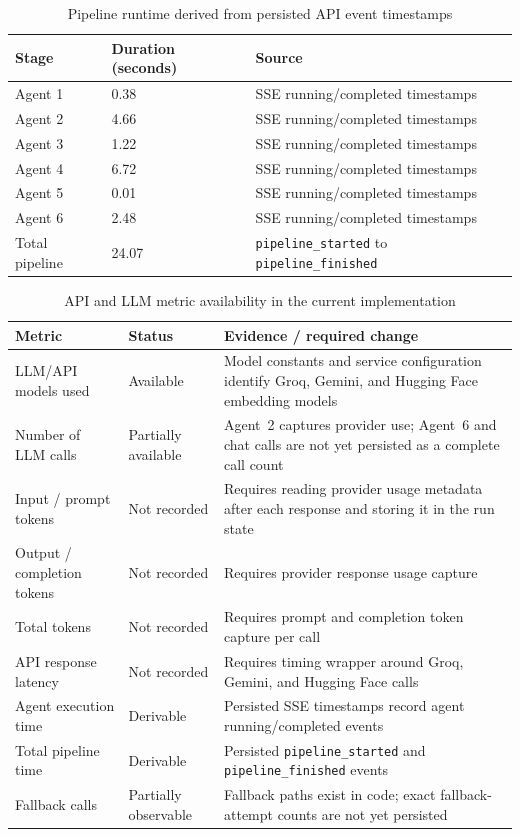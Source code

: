 \documentclass[12pt,a4paper,openany]{report}
\begin{document}
\begin{table}[H]
\centering
\caption{Pipeline runtime derived from persisted API event timestamps}
\label{tab:runtime-results}
\begin{tabular}{p{5cm} p{4cm} p{4cm}}
\hline
Stage & Duration (seconds) & Source \\
\hline
Agent 1 & 0.38 & SSE running/completed timestamps \\
Agent 2 & 4.66 & SSE running/completed timestamps \\
Agent 3 & 1.22 & SSE running/completed timestamps \\
Agent 4 & 6.72 & SSE running/completed timestamps \\
Agent 5 & 0.01 & SSE running/completed timestamps \\
Agent 6 & 2.48 & SSE running/completed timestamps \\
Total pipeline & 24.07 & \texttt{pipeline\_started} to \texttt{pipeline\_finished} \\
\hline
\end{tabular}
\end{table}

\begin{table}[H]
\centering
\caption{API and LLM metric availability in the current implementation}
\label{tab:api-observability}
\begin{tabular}{p{4cm} p{4cm} p{6cm}}
\hline
Metric & Status & Evidence / required change \\
\hline
LLM/API models used & Available & Model constants and service configuration identify Groq, Gemini, and Hugging Face embedding models \\
Number of LLM calls & Partially available & Agent~2 captures provider use; Agent~6 and chat calls are not yet persisted as a complete call count \\
Input / prompt tokens & Not recorded & Requires reading provider usage metadata after each response and storing it in the run state \\
Output / completion tokens & Not recorded & Requires provider response usage capture \\
Total tokens & Not recorded & Requires prompt and completion token capture per call \\
API response latency & Not recorded & Requires timing wrapper around Groq, Gemini, and Hugging Face calls \\
Agent execution time & Derivable & Persisted SSE timestamps record agent running/completed events \\
Total pipeline time & Derivable & Persisted \texttt{pipeline\_started} and \texttt{pipeline\_finished} events \\
Fallback calls & Partially observable & Fallback paths exist in code; exact fallback-attempt counts are not yet persisted \\
\hline
\end{tabular}
\end{table}
\end{document}
